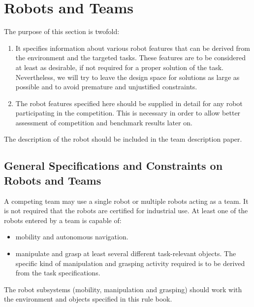 

\section{Robots and Teams}
\label{sec:RobotsTeams}
The purpose of this section is twofold: 
\begin{enumerate}
\item It specifies information about various robot features that can be derived from the environment and the targeted tasks. These features are to be considered at least as desirable, if not required for a proper solution of the task. Nevertheless, we will try to leave the design space for solutions as large as possible and to avoid premature and unjustified constraints.
\item The robot features specified here should be supplied in detail for any robot participating in the competition. This is necessary in order to allow better assessment of competition and benchmark results later on. 
\end{enumerate}

The description of the robot should be included in the team description paper.

\subsection{General Specifications and Constraints on Robots and Teams}
\label{ssec:RobotSpecification}

\begin{robotSpec}[System]
A competing team may use a single robot or multiple robots acting as a team.
It is not required that the robots are certified for industrial use.
At least one of the robots entered by a team is capable of:
\begin{itemize}
\item mobility and autonomous navigation. 
\item manipulate and grasp at least several different task-relevant objects. The specific kind of manipulation and grasping activity required is to be derived from the task specifications.
\end{itemize}
The robot subsystems (mobility, manipulation and grasping) should work with the environment and objects specified in this rule book.
\end{robotSpec}

